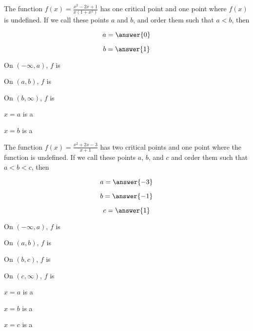 \documentclass[handout]{ximera}
\begin{document}
\begin{exercise}
The function $f(x) =\frac{x^2-2x+1}{x(1+x^2)}$ has one critical
point and one point where $f(x)$ is undefined.  If we call these  points $a$ and $b$, and order them
such that $a < b$, then

$$
a = \answer{0}
$$

$$
b=\answer{1}
$$

On $(-\infty,a)$, $f$ is 

On $(a,b)$, $f$ is 

On $(b,\infty)$, $f$ is 


$x=a$ is a 

$x=b$ is a 

\end{exercise}


\begin{exercise}
The function $f(x) =\frac{x^2+2x-3}{x+1}$ has two critical points and one point where the function is undefined.
If we call these points $a$, $b$, and $c$ and order them such
that $a < b < c$, then

$$
a = \answer{-3}
$$

$$
b=\answer{-1}
$$

$$
c=\answer{1}
$$



On $(-\infty,a)$, $f$ is 

On $(a,b)$, $f$ is 

On $(b,c)$, $f$ is 

On $(c,\infty)$, $f$ is 


$x=a$ is a 

$x=b$ is a 

$x=c$ is a 

\end{exercise}
\end{document}
